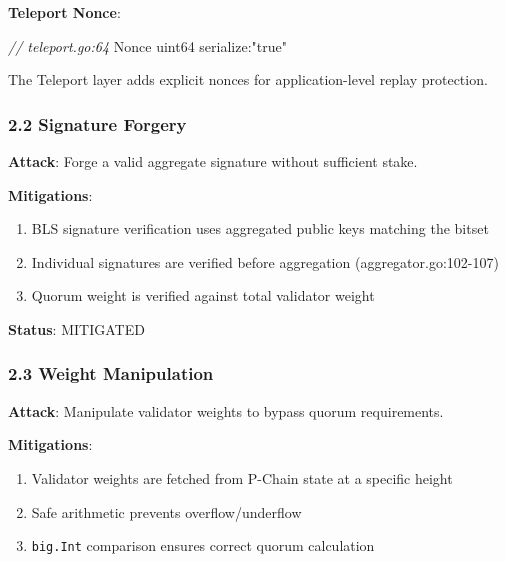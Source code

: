 \documentclass[
]{article}
\newenvironment{Shaded}{}{}
\newcommand{\CommentTok}[1]{\textcolor[rgb]{0.38,0.63,0.69}{\textit{#1}}}
\newcommand{\DataTypeTok}[1]{\textcolor[rgb]{0.56,0.13,0.00}{#1}}
\newcommand{\NormalTok}[1]{#1}
\newcommand{\StringTok}[1]{\textcolor[rgb]{0.25,0.44,0.63}{#1}}
\providecommand{\tightlist}{%
  \setlength{\itemsep}{0pt}\setlength{\parskip}{0pt}}
\begin{document}
\textbf{Teleport Nonce}:

\begin{Shaded}
\begin{Highlighting}[]
\CommentTok{// teleport.go:64}
\NormalTok{Nonce }\DataTypeTok{uint64} \StringTok{\textasciigrave{}serialize:"true"\textasciigrave{}}
\end{Highlighting}
\end{Shaded}

The Teleport layer adds explicit nonces for application-level replay
protection.

\subsubsection{2.2 Signature Forgery}\label{22-signature-forgery}

\textbf{Attack}: Forge a valid aggregate signature without sufficient
stake.

\textbf{Mitigations}:

\begin{enumerate}
\def\labelenumi{\arabic{enumi}.}
\tightlist
\item
  BLS signature verification uses aggregated public keys matching the
  bitset
\item
  Individual signatures are verified before aggregation
  (aggregator.go:102-107)
\item
  Quorum weight is verified against total validator weight
\end{enumerate}

\textbf{Status}: MITIGATED

\subsubsection{2.3 Weight Manipulation}\label{23-weight-manipulation}

\textbf{Attack}: Manipulate validator weights to bypass quorum
requirements.

\textbf{Mitigations}:

\begin{enumerate}
\def\labelenumi{\arabic{enumi}.}
\tightlist
\item
  Validator weights are fetched from P-Chain state at a specific height
\item
  Safe arithmetic prevents overflow/underflow
\item
  \texttt{big.Int} comparison ensures correct quorum calculation
\end{enumerate}
\end{document}
